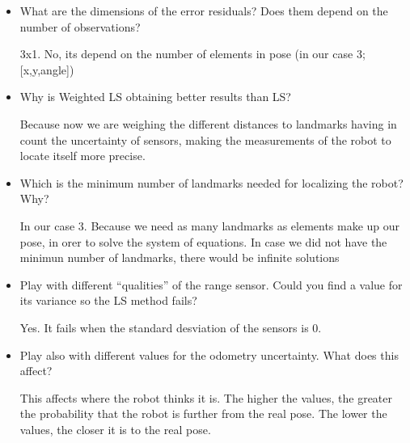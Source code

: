 \documentclass[11pt]{article}
\begin{document}
\begin{itemize}
\item
  What are the dimensions of the error residuals? Does them depend on
  the number of observations?

  3x1. No, its depend on the number of elements in pose (in our case 3;
  {[}x,y,angle{]})
\item
  Why is Weighted LS obtaining better results than LS?

  Because now we are weighing the different distances to landmarks
  having in count the uncertainty of sensors, making the measurements of
  the robot to locate itself more precise.
\item
  Which is the minimum number of landmarks needed for localizing the
  robot? Why?

  In our case 3. Because we need as many landmarks as elements make up
  our pose, in orer to solve the system of equations. In case we did not
  have the minimun number of landmarks, there would be infinite
  solutions
\item
  Play with different ``qualities'' of the range sensor. Could you find
  a value for its variance so the LS method fails?

  Yes. It fails when the standard desviation of the sensors is 0.
\item
  Play also with different values for the odometry uncertainty. What
  does this affect?

  This affects where the robot thinks it is. The higher the values, the
  greater the probability that the robot is further from the real pose. 
  The lower the values, the closer it is to the real pose.
\end{itemize}


    
    
    
\end{document}
